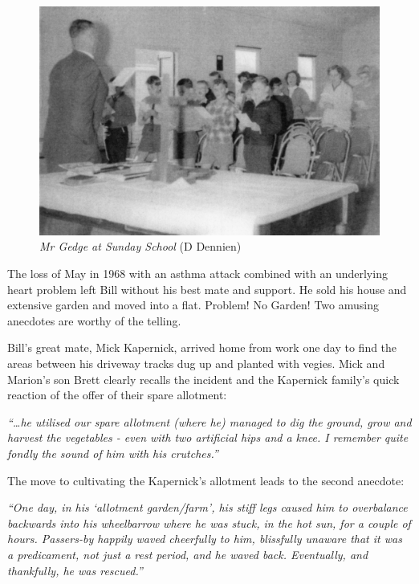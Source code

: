 \begin{figure}
\begin{center}
\includegraphics[width=1.\linewidth,center]{../images/gedgeSundaySchool.jpg}
\caption{{\itshape Mr Gedge at Sunday School} {\scriptsize(D Dennien)}}
\end{center}
\end{figure}




The loss of May in 1968 with an asthma attack combined with an underlying heart problem left Bill without his best mate and support. He sold his house and extensive garden and moved into a flat. Problem! No Garden! Two amusing anecdotes are worthy of the telling.



Bill's great mate, Mick Kapernick, arrived home from work one day to find the areas between his driveway tracks dug up and planted with vegies. Mick and Marion's son Brett clearly recalls the incident and the Kapernick family's quick reaction of the offer of their spare allotment:



\emph{``\ldots he utilised our spare allotment (where he) managed to dig the ground, grow and harvest the vegetables - even with two artificial hips and a knee. I remember quite fondly the sound of him with his crutches.''}



The move to cultivating the Kapernick's allotment leads to the second anecdote:



\emph{``One day, in his `allotment garden/farm', his stiff legs caused him to overbalance backwards into his wheelbarrow where he was stuck, in the hot sun, for a couple of hours. Passers-by happily waved cheerfully to him, blissfully unaware that it was a predicament, not just a rest period, and he waved back. Eventually, and thankfully, he was rescued.''}



